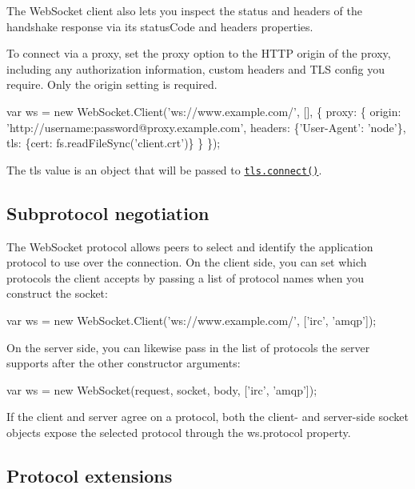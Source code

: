 The Web\+Socket client also lets you inspect the status and headers of the handshake response via its {\ttfamily status\+Code} and {\ttfamily headers} properties.

To connect via a proxy, set the {\ttfamily proxy} option to the H\+T\+TP origin of the proxy, including any authorization information, custom headers and T\+LS config you require. Only the {\ttfamily origin} setting is required.


\begin{DoxyCode}
var ws = new WebSocket.Client('ws://www.example.com/', [], \{
  proxy: \{
    origin:  'http://username:password@proxy.example.com',
    headers: \{'User-Agent': 'node'\},
    tls:     \{cert: fs.readFileSync('client.crt')\}
  \}
\});
\end{DoxyCode}


The {\ttfamily tls} value is an object that will be passed to \href{https://nodejs.org/api/tls.html#tls_tls_connect_options_callback}{\tt {\ttfamily tls.\+connect()}}.

\subsection*{Subprotocol negotiation}

The Web\+Socket protocol allows peers to select and identify the application protocol to use over the connection. On the client side, you can set which protocols the client accepts by passing a list of protocol names when you construct the socket\+:


\begin{DoxyCode}
var ws = new WebSocket.Client('ws://www.example.com/', ['irc', 'amqp']);
\end{DoxyCode}


On the server side, you can likewise pass in the list of protocols the server supports after the other constructor arguments\+:


\begin{DoxyCode}
var ws = new WebSocket(request, socket, body, ['irc', 'amqp']);
\end{DoxyCode}


If the client and server agree on a protocol, both the client-\/ and server-\/side socket objects expose the selected protocol through the {\ttfamily ws.\+protocol} property.

\subsection*{Protocol extensions}

